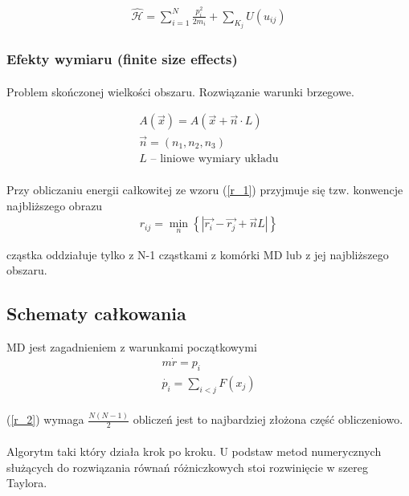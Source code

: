 \documentclass[a4paper,10pt]{article}
\newcommand*{\hham}{\hat{\mathcal{H}}}
\begin{document}
\begin{gather*}
 \hham =  \sum_{i=1}^N \frac{p_i^2}{2m_i} + \sum_{K_j}U(u_{ij})
\end{gather*}

\subsubsection{Efekty wymiaru (finite size effects)}
\paragraph{} Problem skończonej wielkości obszaru. Rozwiązanie warunki brzegowe.

\begin{gather*}
 A(\vec{x}) = A(\vec{x} + \vec{n} \cdot L) \\
 \vec{n} = (n_1, n_2, n_3) \\
 L \text{ – liniowe wymiary układu}
\end{gather*}
\paragraph{} Przy obliczaniu energii całkowitej ze wzoru (\ref{r_1}) przyjmuje się tzw. konwencje najbliższego obrazu
\begin{gather}
 r_{ij} = \min_n \left\{ | \vec{r_i} - \vec{r_j} + \vec{n} L | \right\}
\end{gather}

cząstka oddziałuje tylko z N-1 cząstkami z komórki MD lub z jej najbliższego obszaru.


\subsection{Schematy całkowania}
MD jest zagadnieniem z warunkami początkowymi
\begin{gather}
 m \dot{r} = p_i \\
 \dot{p_i} = \sum_{i < j} F(x_j) \label{r_2}
\end{gather}

\paragraph{} (\ref{r_2}) wymaga $\frac{N(N-1)}{2}$ obliczeń jest to najbardziej złożona część obliczeniowo.

\paragraph{} Algorytm taki który działa krok po kroku. U podstaw metod numerycznych służących do rozwiązania równań różniczkowych stoi rozwinięcie w szereg Taylora. 
\end{document}
